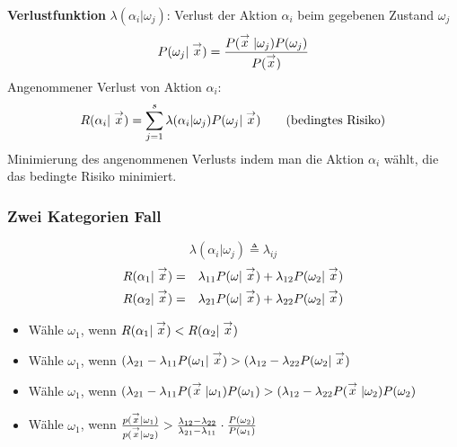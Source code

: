 \textbf{Verlustfunktion}
$\lambda(\alpha_i | \omega_j)$: Verlust der Aktion $\alpha_i$ beim gegebenen Zustand $\omega_j$ $$P(\omega_j | \stackrel{\to}{x}) = \frac{P(\stackrel{\to}{x} | \omega_j) P(\omega_j)}{P(\stackrel{\to}{x})}$$
Angenommener Verlust von Aktion $\alpha_i$: $$R(\alpha_i | \stackrel{\to}{x}) = \sum\limits_{j=1}^s \lambda(\alpha_i | \omega_j) P(\omega_j | \stackrel{\to}{x}) \qquad \textrm{(bedingtes Risiko)}$$
Minimierung des angenommenen Verlusts indem man die Aktion $\alpha_i$ wählt, die das bedingte Risiko minimiert.
\subsubsection*{Zwei Kategorien Fall}
$$\lambda(\alpha_i | \omega_j) \triangleq \lambda_{ij}$$
\begin{eqnarray*}
R(\alpha_1 | \stackrel{\to}{x}) &=& \lambda_{11} P(\omega | \stackrel{\to}{x}) + \lambda_{12} P(\omega_2 | \stackrel{\to}{x}) \\
R(\alpha_2 | \stackrel{\to}{x}) &=& \lambda_{21} P(\omega | \stackrel{\to}{x}) + \lambda_{22} P(\omega_2 | \stackrel{\to}{x}) \\
\end{eqnarray*}

\begin{itemize}
\item Wähle $\omega_1$, wenn $R(\alpha_1 | \stackrel{\to}{x}) < R(\alpha_2 | \stackrel{\to}{x})$
\item Wähle $\omega_1$, wenn $(\lambda_{21} - \lambda_{11} P(\omega_1 | \stackrel{\to}{x}) > (\lambda_{12} - \lambda_{22} P(\omega_2 | \stackrel{\to}{x})$
\item Wähle $\omega_1$, wenn $(\lambda_{21} - \lambda_{11} P(\stackrel{\to}{x} | \omega_1)P(\omega_1) > (\lambda_{12} - \lambda_{22} P(\stackrel{\to}{x} | \omega_2) P(\omega_2)$
\item Wähle $\omega_1$, wenn $\frac{p(\stackrel{\to}{x} | \omega_1)}{p(\stackrel{\to}{x} | \omega_2)} > \frac{\lambda_{12} - \lambda_{22}}{\lambda_{21} - \lambda_{11}} \cdot \frac{P(\omega_2)}{P(\omega_1)}$
\end{itemize}


